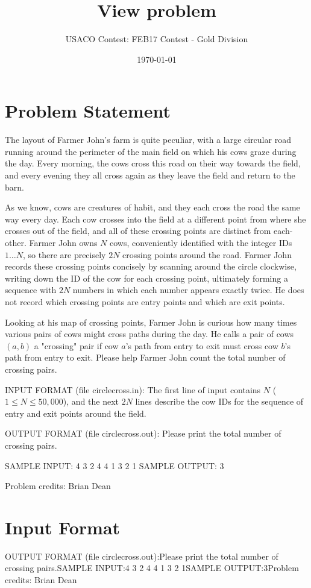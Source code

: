 \documentclass[12pt]{article}
\title{View problem}
\author{USACO Contest: FEB17 Contest - Gold Division}
\date{\today}
\begin{document}
\maketitle

\section*{Problem Statement}

The layout of Farmer John's farm is quite peculiar, with a large circular road
running around the perimeter of the main field on which his cows graze during
the day. Every morning, the cows cross this road on their way towards the field,
and every evening they all cross again as they leave the field and return to the
barn.

As we know, cows are creatures of habit, and they each cross the road the same
way every day.  Each cow crosses into the field at a different point from where
she crosses out of the field, and all of these crossing points are distinct from
each-other. Farmer John owns $N$ cows, conveniently identified with the integer
IDs $1 \ldots N$, so there are precisely $2N$ crossing points around the road. 
Farmer John records these crossing points concisely by scanning around the
circle clockwise, writing down the ID of the cow for each crossing point,
ultimately forming a sequence with $2N$ numbers in which each number appears
exactly twice.  He does not record which crossing points are entry points and
which are exit points.

Looking at his map of crossing points, Farmer John is curious how many times
various pairs of cows might cross paths during the day.  He calls a pair of cows
$(a,b)$ a "crossing" pair if cow $a$'s path from entry to exit must cross cow
$b$'s path from entry to exit.  Please help Farmer John count the total number
of crossing pairs.

INPUT FORMAT (file circlecross.in):
The first line of input contains $N$ ($1 \leq N \leq 50,000$), and the next $2N$
lines describe the cow IDs for the sequence of entry and exit points around the
field.

OUTPUT FORMAT (file circlecross.out):
Please print the total number of crossing pairs.

SAMPLE INPUT:
4
3
2
4
4
1
3
2
1
SAMPLE OUTPUT: 
3


Problem credits: Brian Dean



\section*{Input Format}
OUTPUT FORMAT (file circlecross.out):Please print the total number of crossing pairs.SAMPLE INPUT:4
3
2
4
4
1
3
2
1SAMPLE OUTPUT:3Problem credits: Brian Dean
\end{document}
